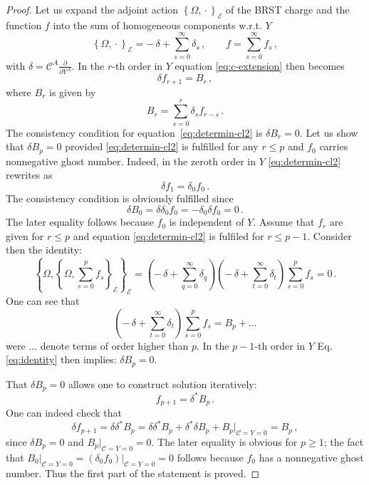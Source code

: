 \documentclass[a4paper,11pt]{amsart}
\numberwithin{thm}{section} %
\numberwithin{equation}{section} %
\numberwithin{figure}{section} %
\newcommand{\pb}[2]{\left\{{}#1{},{}#2{}\right\}}
\renewcommand{\:}{{\rm\, :\,}}
\def\d{\partial}
\newcommand{\dl}[1]{\displaystyle\frac{{\d}}{\d #1}}
\def\cc{{\mathcal C}}
\def\E{{ \mathcal E}}
\begin{document}
\begin{proof}
Let us expand the adjoint action $\pb{\Omega}{\cdot}_\E$ of the BRST
charge and the function $f$ into the sum of homogeneous components
w.r.t. $Y$
\begin{equation}
\pb{\Omega}{\cdot}_\E=-\,\delta+\sum_{s=0}^\infty \delta_s\,, \qquad
f=\sum_{s=0}^\infty f_s\,,
\end{equation}
with $\delta=\cc^A\dl{Y^A}$.  In the $r$-th order in $Y$
equation \eqref{eq:c-extension} then becomes
\begin{equation}
\label{eq:determin-cl2}
\delta f_{r+1}=B_r\,,
\end{equation}
where $B_r$ is given by
\begin{equation}
  B_r=\sum_{s=0}^r \delta_s f_{r-s}\,.
\end{equation}
The consistency condition for equation~\eqref{eq:determin-cl2} is
$\delta B_r=0$.  Let us show that $\delta B_p=0$ provided
\eqref{eq:determin-cl2} is fulfilled for any $r\leq p$ and $f_0$
carries nonnegative ghost number.  Indeed, in the zeroth order in $Y$
\eqref{eq:determin-cl2} rewrites as
\begin{equation}
  \delta f_1=\delta_0 f_0\,.
\end{equation}
The consistency condition is obviously fulfilled since
\begin{equation}
  \delta B_0=\delta \delta_0 f_0=-\delta_0 \delta f_0=0\,.
\end{equation}
The later equality follows because $f_0$ is independent of $Y$.
Assume that $f_r$ are given for $r \leq p$ and
equation \eqref{eq:determin-cl2} is fulfiled for $r \leq p-1$.
Consider then the identity:
\begin{equation}
\label{eq:identity}
\pb{\Omega}{\pb{\Omega}{\sum_{s=0}^p f_s}_\E}_\E =
(-\,\delta+\sum_{q=0}^\infty \delta_q)
(-\,\delta+\sum_{t=0}^\infty \delta_t)\sum_{s=0}^p f_s=0\,.
\end{equation}
One can see that
\begin{equation}
(-\,\delta+\sum_{t=0}^\infty \delta_t)\sum_{s=0}^p f_s=B_p+\ldots
\end{equation}
were $\ldots$ denote terms of order higher than $p$.
In the $p-1$-th order in $Y$ Eq. \eqref{eq:identity}
then implies: $\delta B_p=0$.


That $\delta B_p=0$ allows one to construct
solution iteratively:
\begin{equation}
f_{p+1}=\delta^*B_p\,.
\end{equation}
One can indeed check that
\begin{equation}
\delta f_{p+1}=\delta \delta^* B_p=
\delta \delta^* B_p+\delta^* \delta B_p +B_p{\bigr|}_{\cc=Y=0}=B_p\,,
\end{equation}
since $\delta B_p=0$ and $B_p{\bigr|}_{\cc=Y=0}=0$.  The later
equality is obvious for $p \geq 1$; the fact that
$B_0{\bigr|}_{\cc=Y=0}=(\delta_0 f_0){\bigr|}_{\cc=Y=0}=0$
follows because $f_0$ has a nonnegative ghost number.
Thus the first part of the statement is proved.



\end{proof}
\end{document}
